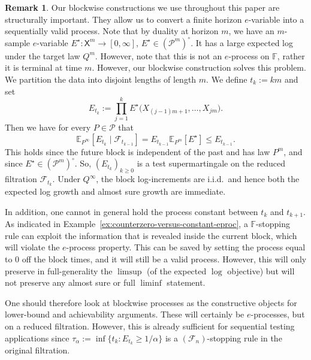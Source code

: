 \documentclass[11pt]{article}
\newcommand{\E}{\mathbb{E}}
\newcommand{\Pcal}{\mathcal{P}}
\newcommand{\X}{\mathsf{X}}
\newcommand{\bbF}{\mathbb F}
\theoremstyle{definition}
\newtheorem{remark}[theorem]{Remark}
\theoremstyle{definition}
\begin{document}
\begin{remark}\label{remark:formalize-blockwise}
Our blockwise constructions we use throughout this paper are structurally important. They allow us to convert a finite horizon $e$-variable into a sequentially valid process. Note that by duality at horizon $m$, we have an $m$-sample $e$-variable $E^{\star}:\X^m\to[0,\infty]$, $E^{\star}\in(\Pcal^m)^{\circ}$. It has a large expected log under the target law $Q^m$. However, note that this is not an $e$-process on $\bbF$, rather it is terminal at time $m$. However, our blockwise construction solves this problem. We partition the data into disjoint lengths of length $m$. We define $t_k:=km$ and set
\[
E_{t_k}:=\prod_{j=1}^k E^\star\bigl(X_{(j-1)m+1},\dots,X_{jm}\bigr).
\]
Then we have for every $P\in\Pcal$ that
\[
\E_{P^\infty}[E_{t_k}\mid \mathcal F_{t_{k-1}}] = E_{t_{k-1}}\E_{P^m}[E^\star] \le E_{t_{k-1}}.
\]
This holds since the future block is independent of the past and has law $P^m$, and since $E^{\star}\in (\Pcal^m)^{\circ}$. So, $(E_{t_k})_{k\ge 0}$ is a test supermartingale on the reduced filtration $\mathcal F_{t_k}$. Under $Q^{\infty}$, the block log-increments are i.i.d.\ and hence both the expected log growth and almost sure growth are immediate.

In addition, one cannot in general hold the process constant between $t_k$ and $t_{k+1}$. As indicated in Example~\ref{ex:counterzero-versus-constant-eproc}, a $\bbF$-stopping rule can exploit the information that is revealed inside the current block, which will violate the $e$-process property. This can be saved by setting the process equal to $0$ off the block times, and it will still be a valid process. However, this will only preserve in full-generality the $\limsup$ (of the expected $\log$ objective) but will not preserve any almost sure or full $\liminf$ statement.

One should therefore look at blockwise processes as the constructive objects for lower-bound and achievability arguments. These will certainly be $e$-processes, but on a reduced filtration. However, this is already sufficient for sequential testing applications since $\tau_{\alpha}:=\inf\{t_k:E_{t_k}\ge 1/\alpha\}$ is a $(\mathcal F_n)$-stopping rule in the original filtration.
\end{remark}
\end{document}
